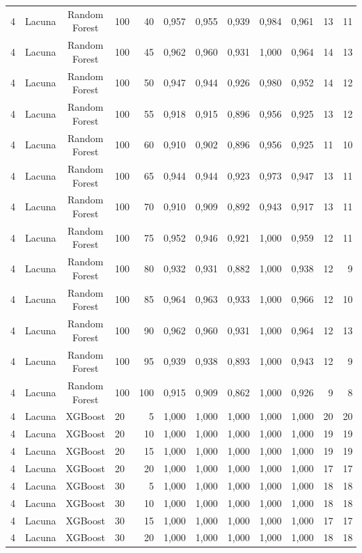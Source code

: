 \begin{longtable}{ccclrrrrrrrr}
4 & Lacuna & Random Forest & 100 & 40 & 0,957 & 0,955 & 0,939 & 0,984 & 0,961 & 13 & 11 \\
4 & Lacuna & Random Forest & 100 & 45 & 0,962 & 0,960 & 0,931 & 1,000 & 0,964 & 14 & 13 \\
4 & Lacuna & Random Forest & 100 & 50 & 0,947 & 0,944 & 0,926 & 0,980 & 0,952 & 14 & 12 \\
4 & Lacuna & Random Forest & 100 & 55 & 0,918 & 0,915 & 0,896 & 0,956 & 0,925 & 13 & 12 \\
4 & Lacuna & Random Forest & 100 & 60 & 0,910 & 0,902 & 0,896 & 0,956 & 0,925 & 11 & 10 \\
4 & Lacuna & Random Forest & 100 & 65 & 0,944 & 0,944 & 0,923 & 0,973 & 0,947 & 13 & 11 \\
4 & Lacuna & Random Forest & 100 & 70 & 0,910 & 0,909 & 0,892 & 0,943 & 0,917 & 13 & 11 \\
4 & Lacuna & Random Forest & 100 & 75 & 0,952 & 0,946 & 0,921 & 1,000 & 0,959 & 12 & 11 \\
4 & Lacuna & Random Forest & 100 & 80 & 0,932 & 0,931 & 0,882 & 1,000 & 0,938 & 12 & 9 \\
4 & Lacuna & Random Forest & 100 & 85 & 0,964 & 0,963 & 0,933 & 1,000 & 0,966 & 12 & 10 \\
4 & Lacuna & Random Forest & 100 & 90 & 0,962 & 0,960 & 0,931 & 1,000 & 0,964 & 12 & 13 \\
4 & Lacuna & Random Forest & 100 & 95 & 0,939 & 0,938 & 0,893 & 1,000 & 0,943 & 12 & 9 \\
4 & Lacuna & Random Forest & 100 & 100 & 0,915 & 0,909 & 0,862 & 1,000 & 0,926 & 9 & 8 \\
4 & Lacuna & XGBoost & 20 & 5 & 1,000 & 1,000 & 1,000 & 1,000 & 1,000 & 20 & 20 \\
4 & Lacuna & XGBoost & 20 & 10 & 1,000 & 1,000 & 1,000 & 1,000 & 1,000 & 19 & 19 \\
4 & Lacuna & XGBoost & 20 & 15 & 1,000 & 1,000 & 1,000 & 1,000 & 1,000 & 19 & 19 \\
4 & Lacuna & XGBoost & 20 & 20 & 1,000 & 1,000 & 1,000 & 1,000 & 1,000 & 17 & 17 \\
4 & Lacuna & XGBoost & 30 & 5 & 1,000 & 1,000 & 1,000 & 1,000 & 1,000 & 18 & 18 \\
4 & Lacuna & XGBoost & 30 & 10 & 1,000 & 1,000 & 1,000 & 1,000 & 1,000 & 18 & 18 \\
4 & Lacuna & XGBoost & 30 & 15 & 1,000 & 1,000 & 1,000 & 1,000 & 1,000 & 17 & 17 \\
4 & Lacuna & XGBoost & 30 & 20 & 1,000 & 1,000 & 1,000 & 1,000 & 1,000 & 18 & 18 \\

\end{longtable}
